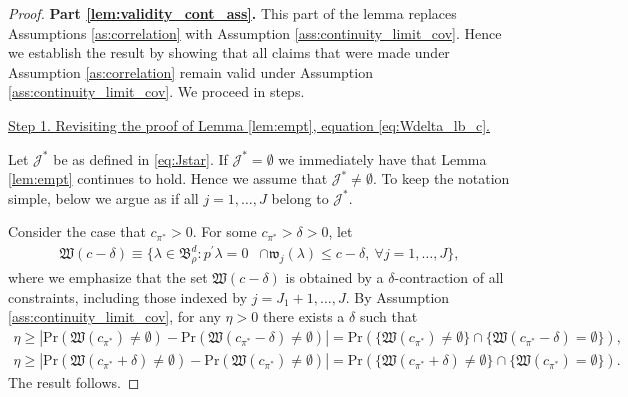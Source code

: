 \documentclass[letterpaper,11pt]{article}
\theoremstyle{myplain}
\theoremstyle{mydefinition}
\theoremstyle{myremark}
\newcommand{\cJ}{\mathcal{J}}
\numberwithin{equation}{section}
\numberwithin{figure}{section}
\begin{document}
\begin{appendices}
\begin{proof}
 \textbf{Part \ref{lem:validity_cont_ass}.}
This part of the lemma replaces Assumptions \ref{as:correlation} with Assumption \ref{ass:continuity_limit_cov}. Hence we establish the result by showing that all claims that were made under Assumption \ref{as:correlation} remain valid under Assumption \ref{ass:continuity_limit_cov}. We proceed in steps.\smallskip

\noindent \underline{Step 1. Revisiting the proof of Lemma \ref{lem:empt}, equation \eqref{eq:Wdelta_lb_c}.}

Let $\cJ^*$ be as defined in \eqref{eq:Jstar}. If $\cJ^*=\emptyset$ we immediately have that Lemma \ref{lem:empt} continues to hold. Hence we assume that $\cJ^*\neq \emptyset$. To keep the notation simple, below we argue as if all $j=1,\dots,J$ belong to $\cJ^*$.

Consider the case that $c_{\pi^*}>0$. For some $c_{\pi^*}>\delta>0$, let
	\begin{align}
\mathfrak{W}(c-\delta)
\equiv \big\{ \lambda\in \mathfrak B^d_\rho: p^\prime \lambda =0 &\cap \mathfrak{w}_{j}(\lambda)\le c-\delta , \: \forall j=1,\dots,J\big\}, \label{eq:Wdelta_ass_cont}
	\end{align}
	where we emphasize that the set $\mathfrak{W}(c-\delta)$ is obtained by a $\delta$-contraction of all constraints, including those indexed by $j=J_1+1,\dots,J$. By Assumption \ref{ass:continuity_limit_cov}, for any $\eta>0$ there exists a $\delta$ such that
	\begin{align*}
	\eta \ge \left\vert \mathrm{Pr}\left(\mathfrak{W}(c_{\pi^*})\neq \emptyset \right)-\mathrm{Pr}\left(\mathfrak{W}(c_{\pi^*}-\delta)\neq \emptyset \right)\right\vert = \mathrm{Pr}\left(\{\mathfrak{W}(c_{\pi^*})\neq \emptyset\} \cap  \{\mathfrak{W}(c_{\pi^*}-\delta)=\emptyset\}\right),\\
	\eta \ge \left\vert \mathrm{Pr}\left(\mathfrak{W}(c_{\pi^*}+\delta)\neq \emptyset \right)-\mathrm{Pr}\left(\mathfrak{W}(c_{\pi^*})\neq \emptyset \right)\right\vert = \mathrm{Pr}\left(\{\mathfrak{W}(c_{\pi^*}+\delta)\neq \emptyset\} \cap  \{\mathfrak{W}(c_{\pi^*})=\emptyset\}\right).
	\end{align*}
	The result follows.
















\smallskip
	

\end{proof}
\end{appendices}
\end{document}
